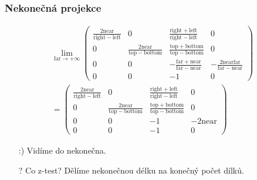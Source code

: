 \begin{frame}
    \frametitle{Nekonečná projekce}
    \begin{align*}
        \lim_{\mathrm{far} \to +\infty}\begin{pmatrix}
            \frac{2\mathrm{near}}{\mathrm{right}-\mathrm{left}}&0&\frac{\mathrm{right}+\mathrm{left}}{\mathrm{right}-\mathrm{left}}&0\\
            0&\frac{2\mathrm{near}}{\mathrm{top}-\mathrm{bottom}}&\frac{\mathrm{top}+\mathrm{bottom}}{\mathrm{top}-\mathrm{bottom}}&0\\
            0&0&-\frac{\mathrm{far}+\mathrm{near}}{\mathrm{far}-\mathrm{near}}&-\frac{2\mathrm{near}\mathrm{far}}{\mathrm{far}-\mathrm{near}}\\
            0&0&-1&0
        \end{pmatrix} \\
        = \begin{pmatrix}
            \frac{2\mathrm{near}}{\mathrm{right}-\mathrm{left}}&0&\frac{\mathrm{right}+\mathrm{left}}{\mathrm{right}-\mathrm{left}}&0\\
            0&\frac{2\mathrm{near}}{\mathrm{top}-\mathrm{bottom}}&\frac{\mathrm{top}+\mathrm{bottom}}{\mathrm{top}-\mathrm{bottom}}&0\\
            0&0&-1&-2\mathrm{near}\\
            0&0&-1&0
        \end{pmatrix}
    \end{align*}
    \pause\vfill
    \begin{itemize}
        \item[:)] Vidíme do nekonečna.
        \item[?] Co z-test? Dělíme nekonečnou délku na konečný počet dílků.
    \end{itemize}
\end{frame}

